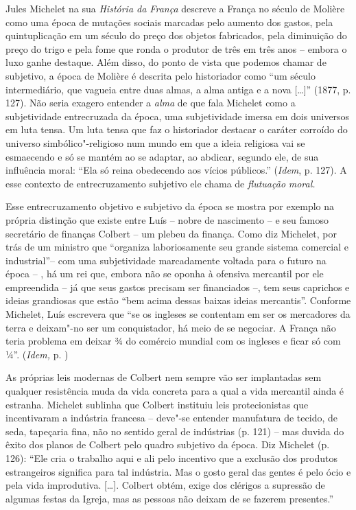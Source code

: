 Jules Michelet na sua \emph{História da França} descreve a França no
século de Molière como uma época de mutações sociais marcadas pelo
aumento dos gastos, pela quintuplicação em um século do preço dos
objetos fabricados, pela diminuição do preço do trigo e pela fome que
ronda o produtor de três em três anos -- embora o luxo ganhe destaque.
Além disso, do ponto de vista que podemos chamar de subjetivo, a época
de Molière é descrita pelo historiador como ``um século intermediário,
que vagueia entre duas almas, a alma antiga e a nova [\ldots{}]'' (1877,
p. 127). Não seria exagero entender a \emph{alma} de que fala Michelet
como a subjetividade entrecruzada da época, uma subjetividade imersa em
dois universos em luta tensa. Um luta tensa que faz o historiador
destacar o caráter corroído do universo simbólico"-religioso num mundo em
que a ideia religiosa vai se esmaecendo e só se mantém ao se adaptar, ao
abdicar, segundo ele, de sua influência moral: ``Ela só reina obedecendo
aos vícios públicos.'' (\emph{Idem}, p. 127). A esse contexto de
entrecruzamento subjetivo ele chama de \emph{flutuação} \emph{moral.}

Esse entrecruzamento objetivo e subjetivo da época se mostra por exemplo
na própria distinção que existe entre Luís  -- nobre de nascimento --
e seu famoso secretário de finanças Colbert -- um plebeu da finança.
Como diz Michelet, por trás de um ministro que ``organiza laboriosamente
seu grande sistema comercial e industrial''-- com uma subjetividade
marcadamente voltada para o futuro na época -- , há um rei que, embora
não se oponha à ofensiva mercantil por ele empreendida -- já que seus
gastos precisam ser financiados --, tem seus caprichos e ideias
grandiosas que estão ``bem acima dessas baixas ideias mercantis''.
Conforme Michelet, Luís  escrevera que ``se os ingleses se contentam
em ser os mercadores da terra e deixam"-no ser um conquistador, há meio
de se negociar. A França não teria problema em deixar ¾ do comércio
mundial com os ingleses e ficar só com ¼''. (\emph{Idem,} p. )

As próprias leis modernas de Colbert nem sempre vão ser implantadas sem
qualquer resistência muda da vida concreta para a qual a vida mercantil
ainda é estranha. Michelet sublinha que Colbert instituiu leis
protecionistas que incentivaram a indústria francesa -- deve"-se entender
manufatura de tecido, de seda, tapeçaria fina, não no sentido geral de
indústrias (p. 121) -- mas duvida do êxito dos planos de Colbert pelo
quadro subjetivo da época. Diz Michelet (p. 126): ``Ele cria o trabalho
aqui e ali pelo incentivo que a exclusão dos produtos estrangeiros
significa para tal indústria. Mas o gosto geral das gentes é pelo ócio e
pela vida improdutiva. [\ldots{}]. Colbert obtém, exige dos clérigos a
supressão de algumas festas da Igreja, mas as pessoas não deixam de se
fazerem presentes.''

